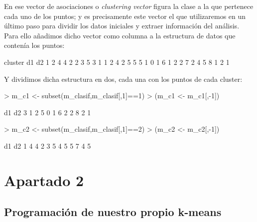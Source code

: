 \documentclass [a4paper] {article}
\begin{document}
En ese vector de asociaciones o \textit{clustering vector} figura la clase a la que pertenece cada uno de los puntos; y es precisamente este vector el que utilizaremos en un último paso para dividir los datos iniciales y extraer información del análisis. Para ello añadimos dicho vector como columna a la estructura de datos que contenía los puntos:
\begin{Schunk}
\begin{Soutput}
  cluster d1 d2
1       2  4  4
2       2  3  5
3       1  1  2
4       2  5  5
5       1  0  1
6       1  2  2
7       2  4  5
8       1  2  1
\end{Soutput}
\end{Schunk}
Y dividimos dicha estructura en dos, cada una con los puntos de cada cluster:
\begin{Schunk}
\begin{Sinput}
> m_c1 <- subset(m_clasif,m_clasif[,1]==1)
> (m_c1 <- m_c1[,-1])
\end{Sinput}
\begin{Soutput}
  d1 d2
3  1  2
5  0  1
6  2  2
8  2  1
\end{Soutput}
\begin{Sinput}
> m_c2 <- subset(m_clasif,m_clasif[,1]==2)
> (m_c2 <- m_c2[,-1])
\end{Sinput}
\begin{Soutput}
  d1 d2
1  4  4
2  3  5
4  5  5
7  4  5
\end{Soutput}
\end{Schunk}


\section{Apartado 2}
\subsection{Programación de nuestro propio \textbf{k-means}}
\end{document}

